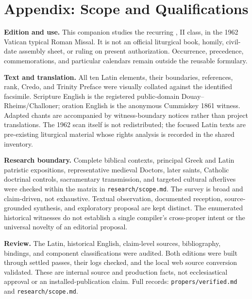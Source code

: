 \sectionguard
\section*{Appendix: Scope and Qualifications}

\begin{studyframe}
\textbf{Edition and use.} This companion studies the recurring
, II class, in the 1962 Vatican
typical Roman Missal. It is not an official liturgical book, homily, civil-date
assembly sheet, or ruling on present authorization. Occurrence, precedence,
commemorations, and particular calendars remain outside the reusable
formulary.

\textbf{Text and translation.} All ten Latin elements, their boundaries,
references, rank, Credo, and Trinity Preface were visually collated against the
identified facsimile. Scripture English is the registered public-domain
Douay--Rheims/Challoner; oration English is the anonymous Cummiskey 1861
witness. Adapted chants are accompanied by witness-boundary notices rather
than project translations. The 1962 scan itself is not redistributed; the
focused Latin texts are pre-existing liturgical material whose rights analysis
is recorded in the shared inventory.

\textbf{Research boundary.} Complete biblical contexts, principal Greek and
Latin patristic expositions, representative medieval Doctors, later saints,
Catholic doctrinal controls, sacramentary transmission, and targeted cultural
afterlives were checked within the matrix in \texttt{research/scope.md}. The
survey is broad and claim-driven, not exhaustive. Textual observation,
documented reception, source-grounded synthesis, and exploratory proposal are
kept distinct. The enumerated historical witnesses do not establish a single
compiler's cross-proper intent or the universal novelty of an editorial
proposal.

\textbf{Review.} The Latin, historical English, claim-level sources,
bibliography, bindings, and component classifications were audited. Both
editions were built through settled passes, their logs checked, and the local
web source conversion validated. These are internal source and production
facts, not ecclesiastical approval or an installed-publication claim. Full
records: \nolinkurl{propers/verified.md} and
\nolinkurl{research/scope.md}.
\end{studyframe}
